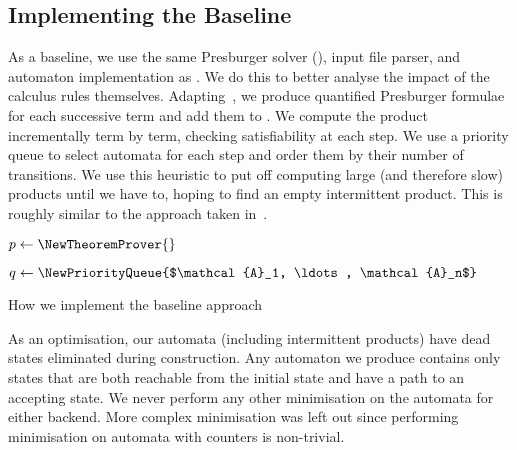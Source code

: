 \subsection{Implementing the Baseline}\label{sec:implementing-baseline}

As a baseline, we use the same Presburger solver (\Princess{}), input file parser,
and automaton implementation as \Catra{}. We do this to better analyse the impact
of the calculus rules themselves. Adapting~\cite{generate-parikh-image}, we
produce quantified Presburger formulae for each successive term and add them to
\Princess{}. We compute the product incrementally term by term, checking
satisfiability at each step. We use a priority queue to select automata for each
step and order them by their number of transitions. We use this heuristic to put
off computing large (and therefore slow) products until we have to, hoping to
find an empty intermittent product. This is roughly similar to the approach
taken in~\cite{approximate-parikh}.

\begin{algorithm}

  $p \gets \NewTheoremProver{}$



  $q \gets \NewPriorityQueue{$\mathcal{A}_1, \ldots, \mathcal{A}_n$}$


  
  \caption{How we implement the baseline approach}\label{alg:baseline}
  \end{algorithm}

As an optimisation, our automata (including intermittent products) have dead
states eliminated during construction. Any automaton we produce contains only
states that are both reachable from the initial state and have a path to an
accepting state. We never perform any other minimisation on the automata for
either backend. More complex minimisation was left out since performing
minimisation on automata with counters is non-trivial.

